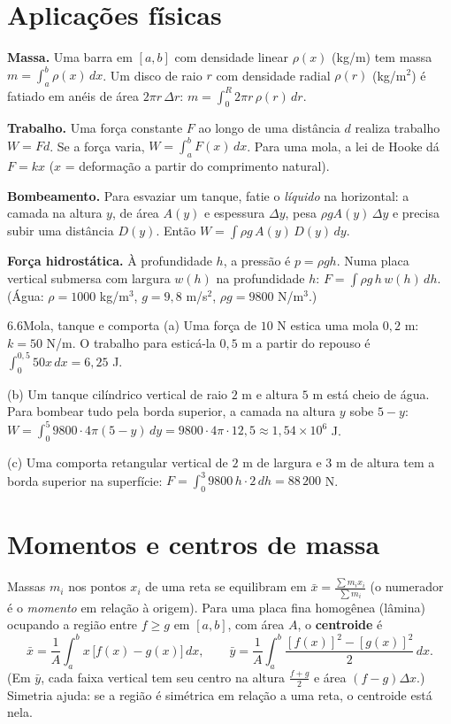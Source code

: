 \section{Aplicações físicas}

\textbf{Massa.} Uma barra em $[a,b]$ com densidade linear $\rho(x)$ (kg/m) tem massa
$m=\int_a^b\rho(x)\,dx$. Um disco de raio $r$ com densidade radial $\rho(r)$ (kg/m$^2$) é
fatiado em anéis de área $2\pi r\,\Delta r$: $m=\int_0^R2\pi r\,\rho(r)\,dr$.

\textbf{Trabalho.} Uma força constante $F$ ao longo de uma distância $d$ realiza trabalho
$W=Fd$. Se a força varia, $W=\int_a^bF(x)\,dx$. Para uma mola, a lei de Hooke dá $F=kx$
($x$ = deformação a partir do comprimento natural).

\textbf{Bombeamento.} Para esvaziar um tanque, fatie o \emph{líquido} na horizontal: a camada
na altura $y$, de área $A(y)$ e espessura $\Delta y$, pesa $\rho g A(y)\,\Delta y$ e precisa
subir uma distância $D(y)$. Então $W=\int\rho g\,A(y)\,D(y)\,dy$.

\textbf{Força hidrostática.} À profundidade $h$, a pressão é $p=\rho gh$. Numa placa
vertical submersa com largura $w(h)$ na profundidade $h$: $F=\int\rho g\,h\,w(h)\,dh$.
(Água: $\rho=1000$ kg/m$^3$, $g=9{,}8$ m/s$^2$, $\rho g=9800$ N/m$^3$.)

\begin{exemplo}{6.6}{Mola, tanque e comporta}
(a) Uma força de $10$ N estica uma mola $0{,}2$ m: $k=50$ N/m. O trabalho para esticá-la
$0{,}5$ m a partir do repouso é $\int_0^{0{,}5}50x\,dx=6{,}25$ J.

(b) Um tanque cilíndrico vertical de raio $2$ m e altura $5$ m está cheio de água. Para
bombear tudo pela borda superior, a camada na altura $y$ sobe $5-y$:
$W=\int_0^5 9800\cdot4\pi(5-y)\,dy=9800\cdot4\pi\cdot12{,}5\approx1{,}54\times10^6$ J.

(c) Uma comporta retangular vertical de $2$ m de largura e $3$ m de altura tem a borda
superior na superfície: $F=\int_0^3 9800\,h\cdot2\,dh=88\,200$ N.
\end{exemplo}

\section{Momentos e centros de massa}

Massas $m_i$ nos pontos $x_i$ de uma reta se equilibram em $\bar x=\frac{\sum m_ix_i}{\sum m_i}$
(o numerador é o \emph{momento} em relação à origem). Para uma placa fina homogênea (lâmina)
ocupando a região entre $f\ge g$ em $[a,b]$, com área $A$, o \textbf{centroide} é
\[
\bar x=\frac1A\int_a^bx\,\big[f(x)-g(x)\big]\,dx,\qquad
\bar y=\frac1A\int_a^b\frac{[f(x)]^2-[g(x)]^2}2\,dx .
\]
(Em $\bar y$, cada faixa vertical tem seu centro na altura $\frac{f+g}2$ e área $(f-g)\Delta x$.)
Simetria ajuda: se a região é simétrica em relação a uma reta, o centroide está nela.

